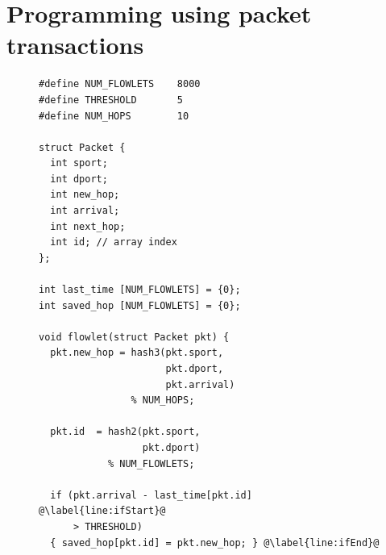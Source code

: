 \section{Programming using packet transactions}
\label{s:transactions}

\begin{figure}[!t]
\begin{minipage}{0.5\textwidth}
\begin{small}
\begin{lstlisting}[style=customc]
#define NUM_FLOWLETS    8000
#define THRESHOLD       5
#define NUM_HOPS        10

struct Packet {
  int sport;
  int dport;
  int new_hop;
  int arrival;
  int next_hop;
  int id; // array index
};

int last_time [NUM_FLOWLETS] = {0};
int saved_hop [NUM_FLOWLETS] = {0};

void flowlet(struct Packet pkt) {
  pkt.new_hop = hash3(pkt.sport,
                      pkt.dport,
                      pkt.arrival)
                % NUM_HOPS;

  pkt.id  = hash2(pkt.sport,
                  pkt.dport)
            % NUM_FLOWLETS;

  if (pkt.arrival - last_time[pkt.id] @\label{line:ifStart}@
      > THRESHOLD)
  { saved_hop[pkt.id] = pkt.new_hop; } @\label{line:ifEnd}@


\end{lstlisting}
\end{small}
\end{minipage}
\end{figure}
